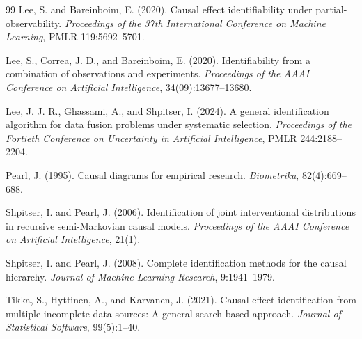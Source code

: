 \documentclass[11pt]{article}
\theoremstyle{definition}
\theoremstyle{plain}
\theoremstyle{remark}
\begin{document}
\begin{thebibliography}{99}
Lee, S. and Bareinboim, E. (2020).
Causal effect identifiability under partial-observability.
\emph{Proceedings of the 37th International Conference on Machine Learning},
PMLR 119:5692--5701.

Lee, S., Correa, J. D., and Bareinboim, E. (2020).
Identifiability from a combination of observations and experiments.
\emph{Proceedings of the AAAI Conference on Artificial Intelligence},
34(09):13677--13680.

Lee, J. J. R., Ghassami, A., and Shpitser, I. (2024).
A general identification algorithm for data fusion problems under systematic
selection.
\emph{Proceedings of the Fortieth Conference on Uncertainty in Artificial
Intelligence}, PMLR 244:2188--2204.

Pearl, J. (1995).
Causal diagrams for empirical research.
\emph{Biometrika}, 82(4):669--688.

Shpitser, I. and Pearl, J. (2006).
Identification of joint interventional distributions in recursive
semi-Markovian causal models.
\emph{Proceedings of the AAAI Conference on Artificial Intelligence}, 21(1).

Shpitser, I. and Pearl, J. (2008).
Complete identification methods for the causal hierarchy.
\emph{Journal of Machine Learning Research}, 9:1941--1979.

Tikka, S., Hyttinen, A., and Karvanen, J. (2021).
Causal effect identification from multiple incomplete data sources: A general
search-based approach.
\emph{Journal of Statistical Software}, 99(5):1--40.
\end{thebibliography}
\end{document}
